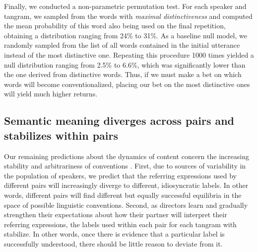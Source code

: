 \documentclass[alpha-refs]{wiley-article}
\begin{document}
Finally, we conducted a non-parametric permutation test.
For each speaker and tangram, we sampled from the words with \emph{maximal distinctiveness} and computed the mean probability of this word also being used on the final repetition, obtaining a distribution ranging from 24\% to 31\%.
As a baseline null model, we randomly sampled from the list of all words contained in the initial utterance instead of the most distinctive one.
Repeating this procedure 1000 times yielded a null distribution ranging from 2.5\% to 6.6\%, which was significantly lower than the one derived from distinctive words.
Thus, if we must make a bet on which words will become conventionalized, placing our bet on the most distinctive ones will yield much higher returns.

\subsection{Semantic meaning diverges across pairs and stabilizes within pairs}

Our remaining predictions about the dynamics of content concern the increasing stability and arbitrariness of conventions \citep{Lewis69_Convention}.
First, due to sources of variability in the population of speakers, we predict that the referring expressions used by different pairs will increasingly diverge to different, idiosyncratic labels.
In other words, different pairs will find different but equally successful equilibria in the space of possible linguistic conventions.
Second, as directors learn and gradually strengthen their expectations about how their partner will interpret their referring expressions, the labels used within each pair for each tangram with stabilize.
In other words, once there is evidence that a particular label is successfully understood, there should be little reason to deviate from it.
\end{document}
